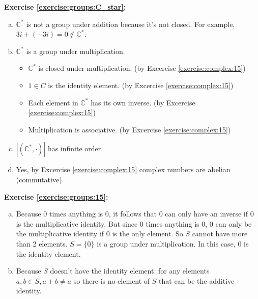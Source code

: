 \noindent\textbf{Exercise \ref{exercise:groups:C_star}:}
\begin{enumerate}[(a)]
\item
${\mathbb C}^{\ast}$ is not a group under addition because it's not closed. For example, 
$3i + (-3i) = 0 \not\in {\mathbb C}^{\ast}$.

\item
${\mathbb C}^{\ast}$ is a group under multiplication.
	
	\begin{itemize}
	\item
	${\mathbb C}^{\ast}$ is closed under multiplication. \quad \quad (by Excercise \ref{exercise:complex:15})

	\item
	$1 \in C$ is the identity element. \quad \quad (by Excercise \ref{exercise:complex:15})

	\item
	Each element in ${\mathbb C}^{\ast}$ has its own inverse. \quad \quad (by Excercise \ref{exercise:complex:15})

	\item
	Multiplication is associative. \quad \quad (by Excercise \ref{exercise:complex:15})
	\end{itemize}
	
\item
$|({\mathbb C}^{\ast}, \cdot)|$ has infinite order.

\item
Yes, by Excercise \ref{exercise:complex:15} complex numbers are abelian (commutative).
\end{enumerate} 

\noindent\textbf{Exercise \ref{exercise:groups:15}:}
\begin{enumerate}[(a)]
\item
Because 0 times anything is 0, it follows that 0 can only have an inverse if 0 is the multiplicative identity. But since 0 times anything is 0, 0 can only be the multiplicative identity if 0 is the only element. So $S$ cannot have more than 2 elements.
 $S = \{0\}$ is a group under multiplication. In this case, $0$ is the identity element.

\item
Because $S$ doesn't have the identity element: for any elements $a,b \in S, a+b \neq a$ so there is no element of $S$ that can be the additive identity.
\end{enumerate}

